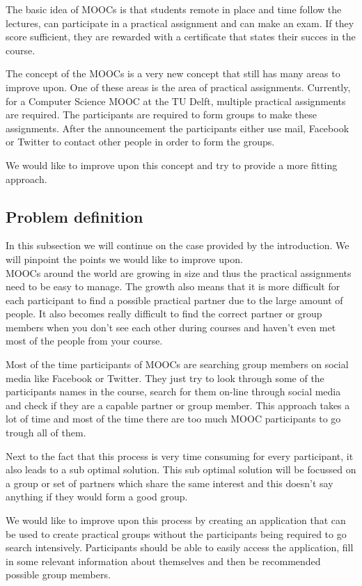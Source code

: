 \documentclass[]{article}
\begin{document}
The basic idea of MOOCs is that students remote in place and time follow the lectures, can participate in a practical assignment and can make an exam.
If they score sufficient, they are rewarded with a certificate that states their succes in the course.

The concept of the MOOCs is a very new concept that still has many areas to improve upon.
One of these areas is the area of practical assignments.
Currently, for a Computer Science MOOC at the TU Delft, multiple practical assignments are required.
The participants are required to form groups to make these assignments.
After the announcement the participants either use mail, Facebook or  Twitter to contact other people in order to form the groups.

We would like to improve upon this concept and try to provide a more fitting approach.

\subsection{Problem definition}
In this subsection we will continue on the case provided by the introduction.
We will pinpoint the points we would like to improve upon.\\

MOOCs around the world are growing in size and thus the practical assignments need to be easy to manage.
The growth also means that it is more difficult for each participant to find a possible practical partner due to the large amount of people.
It also becomes really difficult to find the correct partner or group members when you don't see each other during courses and haven't even met most of the people from your course.

Most of the time participants of MOOCs are searching group members on social media like Facebook or Twitter.
They just try to look through some of the participants names in the course, search for them on-line through social media and check if they are a capable partner or group member.
This approach takes a lot of time and most of the time there are too much MOOC participants to go trough all of them.

Next to the fact that this process is very time consuming for every participant, it also leads to a sub optimal solution.
This sub optimal solution will be focussed on a group or set of partners which share the same interest and this doesn't say anything if they would form a good group.

We would like to improve upon this process by creating an application that can be used to create practical groups without the participants being required to go search intensively.
Participants should be able to easily access the application, fill in some relevant information about themselves and then be recommended possible group members.
\end{document}
